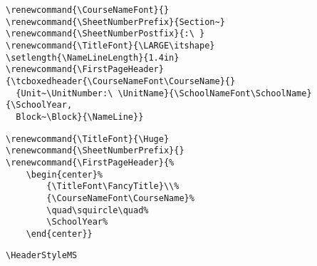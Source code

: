 \documentclass[12pt,twoside,parskip,notitle]{handout}
\begin{document}
\newpage

\begingroup
\renewcommand{\SheetNumberPrefix}{Section~}
\renewcommand{\SheetNumberPostfix}{:\ }
\renewcommand{\TitleFont}{\LARGE\itshape}
\setlength{\NameLineLength}{1.4in}
\renewcommand{\FirstPageHeader}{\tcboxedheader{\CourseNameFont\CourseName}{}{Unit~\UnitNumber:\ \UnitName}{\SchoolNameFont\SchoolName}{\SchoolYear, Block~\Block}{\NameLine}}
\maketitle
\singlespacing
\begin{verbatim}
\renewcommand{\CourseNameFont}{}
\renewcommand{\SheetNumberPrefix}{Section~}
\renewcommand{\SheetNumberPostfix}{:\ }
\renewcommand{\TitleFont}{\LARGE\itshape}
\setlength{\NameLineLength}{1.4in}
\renewcommand{\FirstPageHeader}{\tcboxedheader{\CourseNameFont\CourseName}{}
  {Unit~\UnitNumber:\ \UnitName}{\SchoolNameFont\SchoolName}{\SchoolYear, 
  Block~\Block}{\NameLine}}
\end{verbatim}
\endgroup

\newpage

\begingroup
\renewcommand{\TitleFont}{\Huge}
\renewcommand{\SheetNumberPrefix}{}
\renewcommand{\FirstPageHeader}{%
	\begin{center}%
		{\TitleFont\FancyTitle}\\%
		{\CourseNameFont\CourseName}%
		\quad\squircle\quad%
		\SchoolYear%
	\end{center}}
\maketitle
\begin{verbatim}
\renewcommand{\TitleFont}{\Huge}
\renewcommand{\SheetNumberPrefix}{}
\renewcommand{\FirstPageHeader}{%
    \begin{center}%
        {\TitleFont\FancyTitle}\\%
        {\CourseNameFont\CourseName}%
        \quad\squircle\quad%
        \SchoolYear%
    \end{center}}
\end{verbatim}
\endgroup

\newpage

\begingroup
\HeaderStyleMS
\maketitle
\verb|\HeaderStyleMS|
\endgroup
\end{document}
